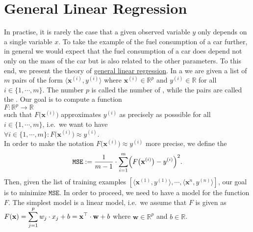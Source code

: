 \section{General Linear Regression}
In practise, it is rarely the case that a given observed variable $y$ only depends on a single variable $x$.
To take the example of the fuel consumption of a car further, in general we would expect that the fuel consumption
of a car does depend not only on the mass of the car but is also related to the other parameters.  
To this end, we present the theory of   
\href{https://en.wikipedia.org/wiki/Linear_regression}{general linear regression}.
In a  we are given a list of $m$ pairs of the form $\langle\mathbf{x}^{(i)}, y^{(i)} \rangle$ 
where $\mathbf{x}^{(i)} \in \mathbb{R}^p$ and $y^{(i)} \in \mathbb{R}$ for all $i \in \{1,\cdots,m\}$.  The
number $p$ is called the number of , while the pairs are called the .
Our goal is to compute a function 
\\[0.2cm]
\hspace*{1.3cm}
$F:\mathbb{R}^p \rightarrow \mathbb{R}$
\\[0.2cm]  
such that $F\bigl(\mathbf{x}^{(i)}\bigr)$ approximates  $y^{(i)}$ as precisely as posssible
for all $i\in\{1,\cdots,m\}$, i.e.~we want to have
\\[0.2cm]
\hspace*{1.3cm}
$\forall i\in\{1,\cdots,m\}:F\bigl(\mathbf{x}^{(i)}\bigr) \approx y^{(i)}$.
\\[0.2cm]
In order to make the notation $F\bigl(\mathbf{x}^{(i)}\bigr) \approx y^{(i)}$ more precise, we
define the  
\begin{equation}
  \label{eq:squared-error-1}
  \mathtt{MSE} := \frac{1}{m-1} \cdot \sum\limits_{i=1}^{m} \Bigl(F\bigl(\mathbf{x}^{(i)}\bigr) - y^{(i)}\Bigr)^2. 
\end{equation}
Then, given the list of training examples $[\langle \mathbf{x}^{(1)}, y^{(1)} \rangle, \cdots, \langle
\mathbf{x}^{n}, y^{(n)} \rangle]$, our goal is to minimize $\mathtt{MSE}$.  
In order to proceed, we need to have a model for the function $F$.  The simplest model is a linear
model, i.e.~we assume that $F$ is given as 
\\[0.2cm]
\hspace*{1.3cm}
$\displaystyle F(\mathbf{x}) = \sum\limits_{j=1}^p w_j \cdot x_j + b = \mathbf{x}^\top \cdot \mathbf{w} + b$ \quad where $\mathbf{w} \in \mathbb{R}^p$ and $b\in\mathbb{R}$.
\\[0.2cm]
